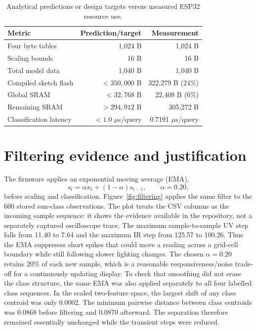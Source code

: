 \documentclass[10pt,a4paper,twocolumn]{article}
\begin{document}
\begin{table}[!bt]
\centering
\caption{Analytical predictions or design targets versus measured ESP32 resource use.}
\label{tab:resources}
\begin{tabularx}{\columnwidth}{@{}Xrr@{}}
\toprule
Metric & Prediction/target & Measurement \\
\midrule
Four byte tables & 1,024 B & 1,024 B \\
Scaling bounds & 16 B & 16 B \\
Total model data & 1,040 B & 1,040 B \\
Compiled sketch flash & $<350{,}000$ B & 322,279 B (24\%) \\
Global SRAM & $<32{,}768$ B & 22,408 B (6\%) \\
Remaining SRAM & $>294{,}912$ B & 305,272 B \\
Classification latency & $<1.0$ $\mu$s/query & 0.7191 $\mu$s/query \\
\bottomrule
\end{tabularx}
\end{table}

\section{Filtering evidence and justification}

The firmware applies an exponential moving average (EMA),
\begin{equation}
s_t = \alpha x_t + (1-\alpha)s_{t-1}, \qquad \alpha=0.20,
\end{equation}
before scaling and classification. Figure~\ref{fig:filtering} applies the
same filter to the 600 stored sun-class observations. The plot treats the CSV
columns as the incoming sample sequence: it shows the evidence available in
the repository, not a separately captured oscilloscope trace. The maximum
sample-to-sample UV step falls from 11.40 to 7.64 and the maximum IR step from
125.57 to 100.26. Thus the EMA suppresses short spikes that could move a
reading across a grid-cell boundary while still following slower lighting
changes. The chosen $\alpha=0.20$ retains 20\% of each new sample, which is a
reasonable responsiveness/noise trade-off for a continuously updating display.
To check that smoothing did not erase the class structure, the same EMA was
also applied separately to all four labelled class sequences. In the scaled
two-feature space, the largest shift of any class centroid was only 0.0002.
The minimum pairwise distance between class centroids was 0.0868 before
filtering and 0.0870 afterward. The separation therefore remained essentially
unchanged while the transient steps were reduced.
\end{document}
